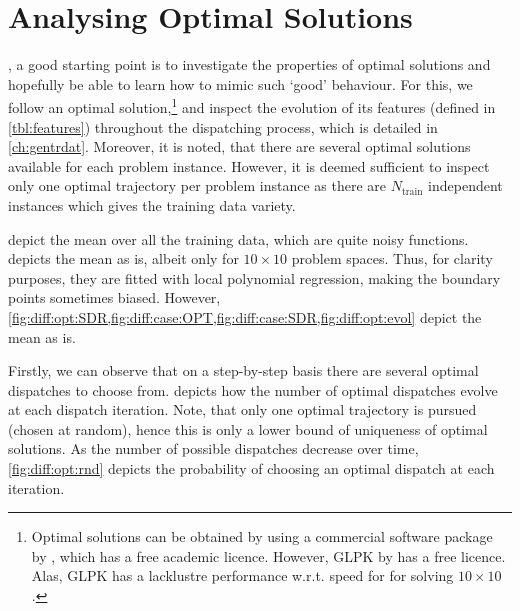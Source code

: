 
\chapter{Analysing Optimal Solutions}\label{ch:analysingopt} 
, a good starting point is 
to investigate the properties of optimal solutions and hopefully be able to 
learn how to mimic such `good' behaviour. 
For this, we follow an optimal solution,\footnote{Optimal solutions can be 
  obtained by using a commercial software package by \citet{gurobi}, which has 
  a free academic licence. However, GLPK by \citet{glpk} has a free licence. 
  Alas, GLPK has a lacklustre performance w.r.t. speed for for solving 
  $10\times10$ \JSP.}
and inspect the evolution of its features  (defined in \cref{tbl:features}) 
throughout the dispatching process, which is detailed in \cref{ch:gentrdat}. 
Moreover, it is noted, that there are several optimal solutions available for 
each problem instance. However, it is deemed sufficient to inspect only one 
optimal trajectory per problem instance as there are $N_{\text{train}}$ 
independent instances which gives the training data variety. 

depict the mean over all the training data, which are quite noisy 
functions.  depicts the mean as is, albeit only for 
$10\times10$ problem spaces. 
Thus, for clarity purposes, they are fitted with local polynomial regression, 
making the boundary points sometimes biased. 
However, 
\cref{fig:diff:opt:SDR,fig:diff:case:OPT,fig:diff:case:SDR,fig:diff:opt:evol} 
depict the mean as is.






Firstly, we can observe that on a step-by-step basis there are several optimal 
dispatches to choose from.  depicts how the number of 
optimal dispatches evolve at each dispatch iteration. Note, that only one 
optimal trajectory is pursued (chosen at random), hence this is only a lower 
bound of uniqueness of optimal solutions.
As the number of possible dispatches decrease over time, 
\cref{fig:diff:opt:rnd} 
depicts the probability of choosing an optimal dispatch at each iteration. 

